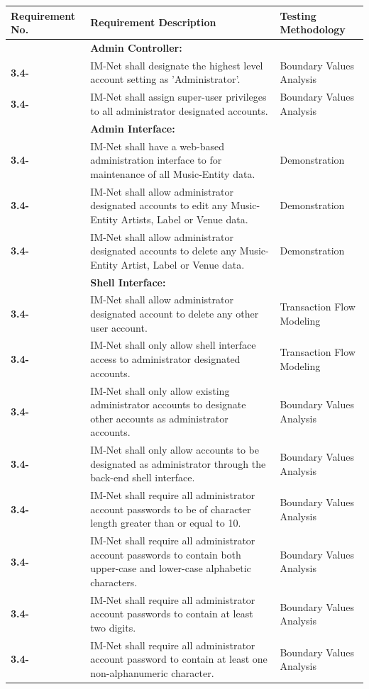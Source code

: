 \documentclass[letterpaper,12pt]{article}
\newcounter{rcounter}							%
\newcommand\rnumber{\stepcounter{rcounter}\arabic{rcounter}}
\begin{document}
{\begin{center}
\begin{tabular}{|l|p{4in}|p{2in}|}
\end{tabular} 
\end{center}

\setcounter{rcounter}{0}
\begin{center}
\begin{tabular}{|l|p{4in}|p{2in}|}
\hline 
Requirement No. & Requirement Description & Testing Methodology \\ 
\hline
& \textbf{Admin Controller:} & \\
\hline
\textbf{3.4-\rnumber} & IM-Net shall designate the highest level account setting as 'Administrator'. & Boundary Values Analysis \\ 
\hline
\textbf{3.4-\rnumber} & IM-Net shall assign super-user privileges to all administrator designated accounts. & Boundary Values Analysis \\ 
\hline 
& \textbf{Admin Interface:} & \\
\hline
\textbf{3.4-\rnumber} & IM-Net shall have a web-based administration interface to for maintenance of all Music-Entity data. & Demonstration \\ 
\hline 
\textbf{3.4-\rnumber} & IM-Net shall allow administrator designated accounts to edit any Music-Entity Artists, Label or Venue data. & Demonstration \\ 
\hline 
\textbf{3.4-\rnumber} & IM-Net shall allow administrator designated accounts to delete any Music-Entity Artist, Label or Venue data. & Demonstration \\ 
\hline 
& \textbf{Shell Interface:} & \\
\hline
\textbf{3.4-\rnumber} & IM-Net shall allow administrator designated account to delete any other user account. & Transaction Flow Modeling \\ 
\hline
\textbf{3.4-\rnumber} & IM-Net shall only allow shell interface access to administrator designated accounts. & Transaction Flow Modeling \\ 
\hline 
\textbf{3.4-\rnumber} & IM-Net shall only allow existing administrator accounts to designate other accounts as administrator accounts. & Boundary Values Analysis \\
\hline 
\textbf{3.4-\rnumber} & IM-Net shall only allow accounts to be designated as administrator through the back-end shell interface. & Boundary Values Analysis \\ 
\hline 
\textbf{3.4-\rnumber} & IM-Net shall require all administrator account passwords to be of character length greater than or equal to 10. & Boundary Values Analysis \\ 
\hline 
\textbf{3.4-\rnumber} & IM-Net shall require all administrator account passwords to contain both upper-case and lower-case alphabetic characters. & Boundary Values Analysis \\
\hline 
\textbf{3.4-\rnumber} & IM-Net shall require all administrator account passwords to contain at least two digits. & Boundary Values Analysis \\ 
\hline 
\textbf{3.4-\rnumber} & IM-Net shall require all administrator account password to contain at least one non-alphanumeric character. & Boundary Values Analysis \\ 
\hline 



\end{tabular}
\end{center}}
\end{document}
